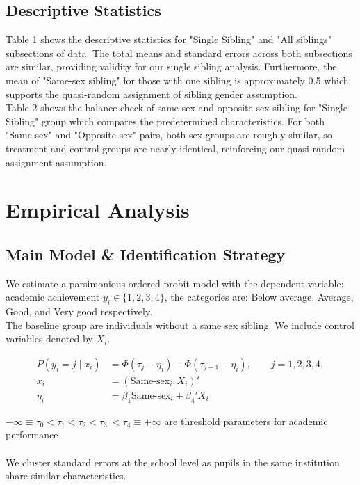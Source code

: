 \documentclass[12pt]{article}
\begin{document}
\subsection{Descriptive Statistics}

Table 1 shows the descriptive statistics for "Single Sibling" and "All siblings" subsections of data. The total means and standard errors across both subsections are similar, providing validity for our single sibling analysis. Furthermore, the mean of "Same-sex sibling" for those with one sibling is approximately 0.5 which supports the quasi-random assignment of sibling gender assumption. \\

Table 2 shows the balance check of same-sex and opposite-sex sibling for "Single Sibling" group which compares the predetermined characteristics. For both "Same-sex" and "Opposite-sex" pairs, both sex groups are roughly similar, so treatment and control groups are nearly identical, reinforcing our quasi-random assignment assumption.

\section{Empirical Analysis}
\subsection{Main Model \& Identification Strategy}
We estimate a parsimonious ordered probit model  with the dependent variable: academic achievement \(y_i \in \{1,2,3,4\}\), the categories are: Below average, Average, Good, and Very good respectively.\\
The baseline group are individuals without a same sex sibling. We include control variables denoted by $X_i$.

\begin{align}
P(y_i = j \mid x_i)
  &= \Phi(\tau_j - \eta_i) - \Phi(\tau_{j-1} - \eta_i), \qquad j = 1,2,3,4, \\
  x_i &= (\text{Same-sex}_i, X_i)'\\ 
\eta_i &= \beta_1 \text{Same-sex}_i + \beta_4' X_i
\end{align}

 
\(-\infty\equiv \tau_0 < \tau_1 < \tau_2 < \tau_3\ < \tau_4 \equiv +\infty\) are threshold parameters for academic performance \\\\
We cluster standard errors at the school level as pupils in the same institution share similar characteristics.
\end{document}
